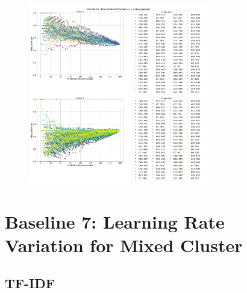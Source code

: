 \documentclass[a4paper,fontsize=8.0pt]{scrartcl}
\begin{document}
\begin{figure}[H]
 \includegraphics[width=0.7\textwidth]{Graphs/BERT/user_interaction_vs_model_performance_precision_all_cps_mixed_data_sep_Heterogeneous.pdf}
\end{figure}


\newpage
\section{Baseline 7: Learning Rate Variation for Mixed Cluster}
\subsection{TF-IDF}
\end{document}
